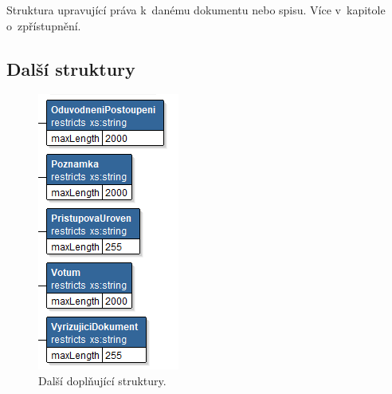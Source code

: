 \documentclass[
  master,
  field=ainfp,
  biblatex,
  language=czech,
  glossaries,
  theorems=false,
  index
]{kidiplom}
\begin{document}
Struktura upravující práva k~danému dokumentu nebo spisu. Více v~kapitole o~zpřístupnění.

\subsection{Další struktury}
\begin{figure}[h]
  \centerline{\includegraphics[width=0.2\linewidth]{./images/Ostatni.png}} 
  \caption{Další doplňující struktury.} 
\end{figure}
\end{document}
